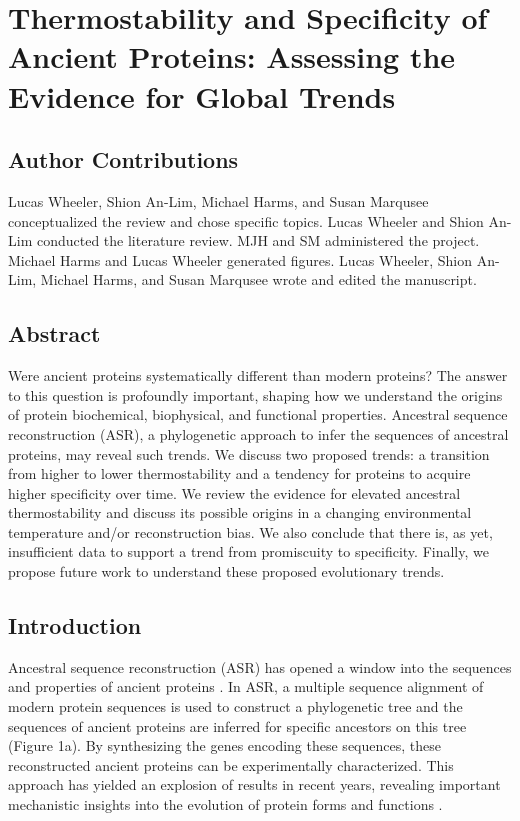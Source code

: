 \chapter{Thermostability and Specificity of Ancient Proteins: Assessing the Evidence for Global Trends}

\section{Author Contributions}

Lucas Wheeler, Shion An-Lim, Michael Harms, and Susan Marqusee conceptualized the review and chose specific
topics. Lucas Wheeler and Shion An-Lim conducted the literature review. MJH and SM administered
the project. Michael Harms and Lucas Wheeler generated figures. Lucas Wheeler, Shion An-Lim, Michael Harms, and Susan Marqusee
wrote and edited the manuscript.

\section{Abstract}

Were ancient proteins systematically different than modern proteins?
The answer to this question is profoundly important, shaping how we
understand the origins of protein biochemical, biophysical, and functional
properties. Ancestral sequence reconstruction (ASR), a phylogenetic
approach to infer the sequences of ancestral proteins, may reveal
such trends. We discuss two proposed trends: a transition from higher
to lower thermostability and a tendency for proteins to acquire higher
specificity over time. We review the evidence for elevated ancestral
thermostability and discuss its possible origins in a changing environmental
temperature and/or reconstruction bias. We also conclude that there
is, as yet, insufficient data to support a trend from promiscuity
to specificity. Finally, we propose future work to understand these
proposed evolutionary trends.

\section{Introduction}

Ancestral sequence reconstruction (ASR) has opened a window into the
sequences and properties of ancient proteins \cite{pauling_chemical_1963,harms_analyzing_2010}.
In ASR, a multiple sequence alignment of modern protein sequences
is used to construct a phylogenetic tree and the sequences of ancient
proteins are inferred for specific ancestors on this tree (Figure
1a). By synthesizing the genes encoding these sequences, these reconstructed
ancient proteins can be experimentally characterized. This approach
has yielded an explosion of results in recent years, revealing important
mechanistic insights into the evolution of protein forms and functions
\cite{gaucher_palaeotemperature_2008,voordeckers_reconstruction_2012,bridgham_epistatic_2009,hobbs_origin_2012,akanuma_experimental_2013,akanuma_phylogeny-based_2011,loughran_stability_2014,perez-jimenez_single-molecule_2011,risso_hyperstability_2013,hart_thermodynamic_2014}.

